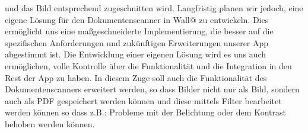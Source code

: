 und das Bild entsprechend zugeschnitten wird.
\newline
\newline
Langfristig planen wir jedoch, eine eigene Lösung für den Dokumentenscanner in Wall@ zu entwickeln. 
Dies ermöglicht uns eine maßgeschneiderte Implementierung, die besser auf die spezifischen Anforderungen und 
zukünftigen Erweiterungen unserer App abgestimmt ist. 
Die Entwicklung einer eigenen Lösung wird es uns auch ermöglichen, 
volle Kontrolle über die Funktionalität und die Integration in den Rest der App zu haben.
\newline
\newline
In diesem Zuge soll auch die Funktionalität des Dokumentenscanners erweitert werden, so dass Bilder nicht nur als 
Bild, sondern auch als PDF gespeichert werden können und diese mittels Filter bearbeitet werden können so dass 
z.B.: Probleme mit der Belichtung oder dem Kontrast behoben werden können.